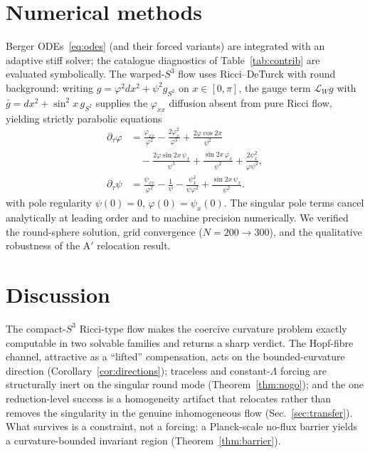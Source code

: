 \documentclass[aps,prd,twocolumn,superscriptaddress,nofootinbib,floatfix]{revtex4-2}
\theoremstyle{plain}
\theoremstyle{definition}
\newcommand{\dtau}{\partial_\tau}
\begin{document}
\section{Numerical methods}\label{sec:numerics}

Berger ODEs~\eqref{eq:odes} (and their forced variants) are integrated with an adaptive stiff solver; the catalogue diagnostics of Table~\ref{tab:contrib} are evaluated symbolically. The warped-$S^3$ flow uses Ricci--DeTurck with round background: writing $g=\varphi^2dx^2+\psi^2 g_{S^2}$ on $x\in[0,\pi]$, the gauge term $\mathcal L_Wg$ with $\bar g=dx^2+\sin^2x\,g_{S^2}$ supplies the $\varphi_{xx}$ diffusion absent from pure Ricci flow, yielding strictly parabolic equations
\begin{align}
\dtau\varphi
&=\tfrac{\varphi_{xx}}{\varphi^2}
 -\tfrac{2\varphi_x^2}{\varphi^3}
 +\tfrac{2\varphi\cos2x}{\psi^2}\nonumber\\
&\quad -\tfrac{2\varphi\sin2x\,\psi_x}{\psi^3}
 +\tfrac{\sin2x\,\varphi_x}{\psi^2}
 +\tfrac{2\psi_x^2}{\varphi\psi^2},\nonumber\\[2pt]
\dtau\psi
&=\tfrac{\psi_{xx}}{\varphi^2}
 -\tfrac1\psi
 -\tfrac{\psi_x^2}{\psi\varphi^2}
 +\tfrac{\sin2x\,\psi_x}{\psi^2}.\nonumber
\end{align}
with pole regularity $\psi(0)=0$, $\varphi(0)=\psi_x(0)$. The singular pole terms cancel analytically at leading order and to machine precision numerically. We verified the round-sphere solution, grid convergence ($N=200\to300$), and the qualitative robustness of the A$'$ relocation result.

\section{Discussion}\label{sec:disc}

The compact-$S^3$ Ricci-type flow makes the coercive curvature problem exactly computable in two solvable families and returns a sharp verdict. The Hopf-fibre channel, attractive as a ``lifted'' compensation, acts on the bounded-curvature direction (Corollary~\ref{cor:directions}); traceless and constant-$\Lambda$ forcing are structurally inert on the singular round mode (Theorem~\ref{thm:nogo}); and the one reduction-level success is a homogeneity artifact that relocates rather than removes the singularity in the genuine inhomogeneous flow (Sec.~\ref{sec:transfer}). What survives is a constraint, not a forcing: a Planck-scale no-flux barrier yields a curvature-bounded invariant region (Theorem~\ref{thm:barrier}).
\end{document}
